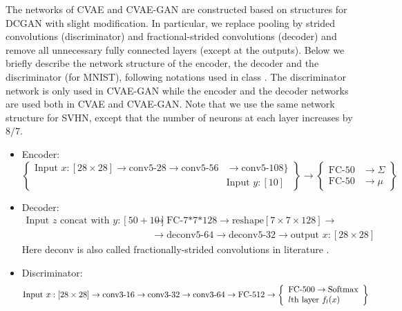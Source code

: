 \documentclass[10pt]{article}
\begin{document}
The networks of CVAE and CVAE-GAN are constructed based on structures for DCGAN \cite{alec2016dcgan} with slight modification. In particular, we replace pooling by strided convolutions (discriminator) and fractional-strided convolutions (decoder) and remove all unnecessary fully connected layers (except at the outputs). Below we briefly describe the network structure of the encoder, the decoder and the discriminator (for MNIST), following notations used in class \cite{class}. The discriminator network is only used in CVAE-GAN while the encoder and the decoder networks are used both in CVAE and CVAE-GAN. Note that we use the same network structure for SVHN, except that the number of neurons at each layer increases by $8/7$.
\begin{itemize}
	\item Encoder: 
  \[
   \left\{\begin{array}{lr}
        \text{Input } x:[28\times 28]\to \text{conv5-28} \to \text{conv5-56} &\to \text{conv5-108}\}\\
        &\text{Input } y:[10]
        \end{array}\right\} \to 
        \left\{\begin{array}{lr}
        \text{FC-50}&\to \Sigma\\
        \text{FC-50}&\to \mu
        \end{array}\right\} 
  \]

	\item Decoder: 
\begin{align}
\text{Input } z \text{ concat with } y: [50 + 10] &\to \text{FC-7*7*128} \to \text{reshape}[7\times 7\times 128] \to \\
&\to \text{deconv5-64} \to \text{deconv5-32} \to \text{output } x:[28\times 28]
\end{align}
Here deconv is also called fractionally-strided convolutions in literature \cite{alec2016dcgan}.
\item Discriminator:
\[
\text{Input } x: [28\times 28] \to \text{conv3-16} \to \text{conv3-32} \to \text{conv3-64} \\
\to \text{FC-512} \to \left\{\begin{array}{lr}
        \text{FC-500}\to \text{Softmax}\\
        \text{$l$th layer $f_l(x)$}
        \end{array}\right\} 
\]
\end{itemize}	
 
\end{document}
